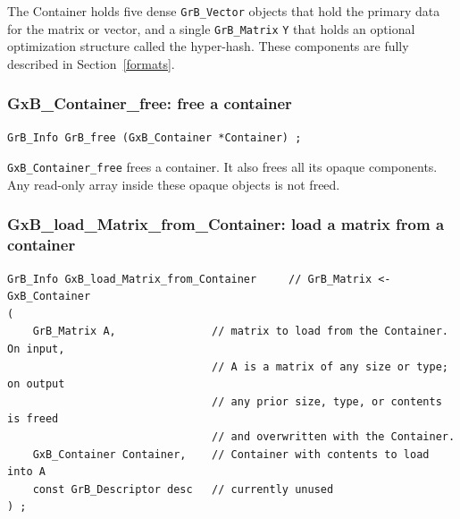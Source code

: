 The Container holds five dense \verb'GrB_Vector' objects that hold the primary
data for the matrix or vector, and a single \verb'GrB_Matrix' \verb'Y' that
holds an optional optimization structure called the hyper-hash.  These
components are fully described in Section~\ref{formats}.

\subsubsection{{\sf GxB\_Container\_free:} free a container}
\label{container_free}

\begin{mdframed}[userdefinedwidth=6in]
{\footnotesize
\begin{verbatim}
GrB_Info GrB_free (GxB_Container *Container) ;
\end{verbatim}
} \end{mdframed}

\verb'GxB_Container_free' frees a container.  It also frees all its opaque
components.  Any read-only array inside these opaque objects is not freed.

\subsubsection{{\sf GxB\_load\_Matrix\_from\_Container:} load a matrix from a container}
\label{load_matrix_from_container}

\begin{mdframed}[userdefinedwidth=6in]
{\footnotesize
\begin{verbatim}
GrB_Info GxB_load_Matrix_from_Container     // GrB_Matrix <- GxB_Container
(
    GrB_Matrix A,               // matrix to load from the Container.  On input,
                                // A is a matrix of any size or type; on output
                                // any prior size, type, or contents is freed
                                // and overwritten with the Container.
    GxB_Container Container,    // Container with contents to load into A
    const GrB_Descriptor desc   // currently unused
) ;
\end{verbatim}
} \end{mdframed}

